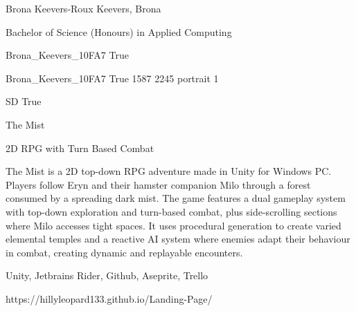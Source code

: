 
\begingroup{}\relax



\def\Key{Brona_Keevers_10FA7}

{Brona Keevers-Roux}
{Keevers, Brona}

{Bachelor of Science (Honours) in Applied Computing}

{Brona_Keevers_10FA7}
{True}

{Brona_Keevers_10FA7}
{True}
{1587}
{2245}
{portrait}
{1}

{SD}
{True}

{The Mist}

{2D RPG with Turn Based Combat}

{The Mist is a 2D top-down RPG adventure made in Unity for Windows PC. Players follow Eryn and their hamster companion Milo through a forest consumed by a spreading dark mist. The game features a dual gameplay system with top-down exploration and turn-based combat, plus side-scrolling sections where Milo accesses tight spaces. It uses procedural generation to create varied elemental temples and a reactive AI system where enemies adapt their behaviour in combat, creating dynamic and replayable encounters.}

{Unity, Jetbrains Rider, Github, Aseprite, Trello}

{https://hillyleopard133.github.io/Landing-Page/}

